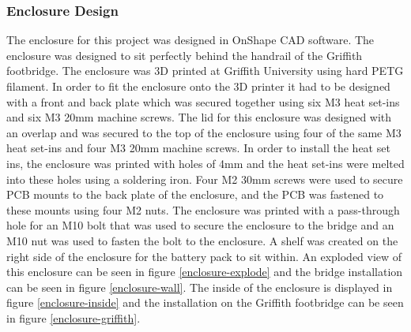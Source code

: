 \subsubsection{Enclosure Design}
The enclosure for this project was designed in OnShape CAD software. The enclosure was designed to sit perfectly behind the handrail of the Griffith footbridge. The enclosure was 3D printed at Griffith University using hard PETG filament. In order to fit the enclosure onto the 3D printer it had to be designed with a front and back plate which was secured together using six M3 heat set-ins and six M3 20mm machine screws. The lid for this enclosure was designed with an overlap and was secured to the top of the enclosure using four of the same M3 heat set-ins and four M3 20mm machine screws. In order to install the heat set ins, the enclosure was printed with holes of 4mm and the heat set-ins were melted into these holes using a soldering iron. Four M2 30mm screws were used to secure PCB mounts to the back plate of the enclosure, and the PCB was fastened to these mounts using four M2 nuts. The enclosure was printed with a pass-through hole for an M10 bolt that was used to secure the enclosure to the bridge and an M10 nut was used to fasten the bolt to the enclosure. A shelf was created on the right side of the enclosure for the battery pack to sit within. An exploded view of this enclosure can be seen in figure \ref{enclosure-explode} and the bridge installation can be seen in figure \ref{enclosure-wall}. The inside of the enclosure is displayed in figure \ref{enclosure-inside} and the installation on the Griffith footbridge can be seen in figure \ref{enclosure-griffith}. 

